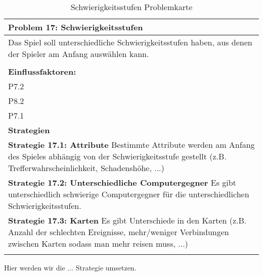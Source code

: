 \documentclass[fontsize=12pt,paper=a4,twoside]{scrartcl}
\begin{document}
\begin{table}[H]
    \centering
    \begin{tabular}{|p{15cm}|}
    \hline
          \textbf{Problem 17: Schwierigkeitsstufen}  \\ \hline
	Das Spiel soll unterschiedliche Schwierigkeitsstufen haben, aus denen der Spieler am Anfang auswählen kann. \\
         \\ \hline
          \textbf{Einflussfaktoren: } \\
	P7.2 \\
	P8.2 \\
	P7.1 \\
          \hline
          \textbf{Strategien} \\ \hline
            {}          
           \label{strategie:17.1}     
          \textbf{Strategie 17.1: Attribute} Bestimmte Attribute werden am Anfang des Spieles abhängig von der Schwierigkeitsstufe gestellt (z.B. Trefferwahrscheinlichkeit, Schadenshöhe, ...)  \\        
  {}          
           \label{strategie:17.2}              
          \textbf{Strategie 17.2: Unterschiedliche Computergegner} Es gibt unterschiedlich schwierige Computergegner für die unterschiedlichen Schwierigkeitsstufen.   \\
	 {}          
           \label{strategie:17.3}     
          \textbf{Strategie 17.3: Karten } Es gibt Unterschiede in den Karten (z.B. Anzahl der schlechten Ereignisse, mehr/weniger Verbindungen zwischen Karten sodass man mehr reisen muss, ...)  \\ 
	 \\ \hline
    \end{tabular}

    \caption{Schwierigkeitsstufen Problemkarte}
    \label{tab:ProblemKarte17}
\end{table}
Hier werden wir die ... Strategie umsetzen. \\
\end{document}
